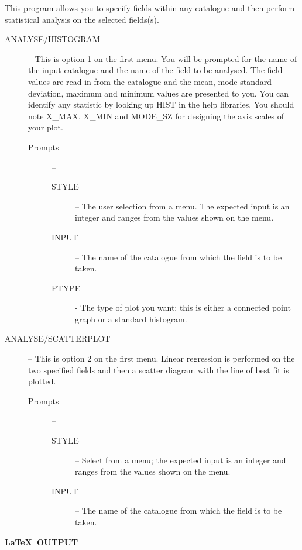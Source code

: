 \documentclass[twoside,11pt]{starlink}
\begin{document}
\begin{footnotesize}
\begin{terminalv}
This program allows you to specify fields within any catalogue and then perform
statistical analysis on the selected fields(s).
\begin{description}
  \item [ANALYSE/HISTOGRAM] --
  This is option 1 on the first menu.
  You will be prompted for the name of the input catalogue and the name of the
  field to be analysed.
  The field values are read in from the catalogue and the mean, mode standard
  deviation, maximum and minimum values are presented to you.
  You can identify any statistic by looking up HIST in the help libraries.
  You should note X\_MAX, X\_MIN and MODE\_SZ for designing the axis scales of
  your plot.
  \begin{description}
    \item [Prompts] --
    \begin{description}
      \item [STYLE] -- The user selection from a menu.
      The expected input is an integer and ranges from the values shown on the menu.
      \item [INPUT] -- The name of the catalogue from which the field is to be taken.
      \item [PTYPE] - The type of plot you want; this is either a connected point graph or
      a standard histogram.
    \end{description}
  \end{description}
  \item [ANALYSE/SCATTERPLOT] --
  This is option 2 on the first menu.
  Linear regression is performed on the two specified fields and then a scatter
  diagram with the line of best fit is plotted.
  \begin{description}
    \item [Prompts] --
    \begin{description}
      \item [STYLE]-- Select from a menu; the expected input is an integer
      and ranges from the values shown on the menu.
      \item [INPUT] -- The name of the catalogue from which the field is to be taken.
    \end{description}
  \end{description}
\end{description}
\end{terminalv}
\end{footnotesize}

\newpage

\begin{center}
  \textbf{\LaTeX\ OUTPUT}
\end{center}
\end{document}
